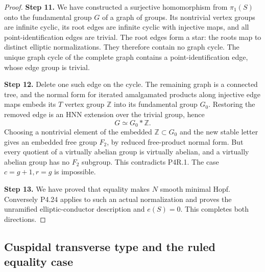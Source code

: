 \begin{proof}
\noindent\textbf{Step 11.} We have constructed a surjective homomorphism from \(\pi_1(S)\) onto the
fundamental group \(G\) of a graph of groups. Its nontrivial vertex groups
are infinite cyclic, its root edges are infinite cyclic with injective
maps, and all point-identification edges are trivial. The root edges
form a star: the roots map to distinct elliptic normalizations. They
therefore contain no graph cycle. The unique graph cycle of the complete
graph contains a point-identification edge, whose edge group is trivial.

\noindent\textbf{Step 12.} Delete one such edge on the cycle. The remaining graph is a connected
tree, and the normal form for iterated amalgamated products along
injective edge maps embeds its \(T\) vertex group \(\mathbb Z\) into its
fundamental group \(G_0\). Restoring the removed edge is an HNN extension
over the trivial group, hence
\[
 G\simeq G_0*\mathbb Z.
\]
Choosing a nontrivial element of the embedded \(\mathbb Z\subset G_0\)
and the new stable letter gives an embedded free group \(F_2\), by reduced
free-product normal form. But every quotient of a virtually abelian group
is virtually abelian, and a virtually abelian group has no \(F_2\)
subgroup. This contradicts P4R.1. The case \(c=g+1,r=g\) is impossible.

\noindent\textbf{Step 13.} We have proved that equality makes \(N\) smooth minimal Hopf. Conversely
P4.24 applies to such an actual normalization and proves the unramified
elliptic-conductor description and \(e(S)=0\). This completes both
directions.
\end{proof}


\subsection{Cuspidal transverse type and the ruled equality case}

